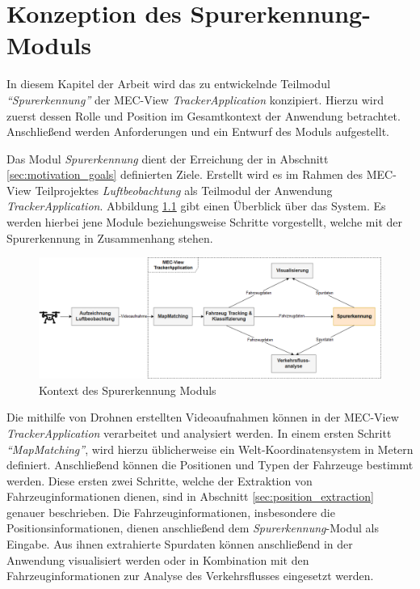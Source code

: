 
\chapter{Konzeption des Spurerkennung-Moduls}
\label{cha:konzeption}

In diesem Kapitel der Arbeit wird das zu entwickelnde Teilmodul \textit{``Spurerkennung''}
der MEC-View \textit{TrackerApplication} konzipiert. Hierzu wird zuerst dessen Rolle und Position im Gesamtkontext
der Anwendung betrachtet. Anschließend werden Anforderungen und ein Entwurf des Moduls aufgestellt.

Das Modul \textit{Spurerkennung} dient der Erreichung der in Abschnitt
\ref{sec:motivation_goals} definierten Ziele. Erstellt wird es im Rahmen des MEC-View Teilprojektes
\textit{Luftbeobachtung} als Teilmodul der Anwendung \textit{TrackerApplication}.
Abbildung \ref{fig:concept_laneDetection_context} gibt einen Überblick über das System.
Es werden hierbei jene Module beziehungsweise Schritte vorgestellt, welche mit der Spurerkennung in
Zusammenhang stehen.

\begin{figure}[H]
    \centering
    \includegraphics[width=\linewidth]{../resources/img/konzeption/Context_LaneDetection}
    \caption{Kontext des Spurerkennung Moduls}
    \label{fig:concept_laneDetection_context}
\end{figure}

Die mithilfe von Drohnen erstellten Videoaufnahmen können in der MEC-View \textit{TrackerApplication}
verarbeitet und analysiert werden. In einem ersten Schritt \textit{``MapMatching''}, wird hierzu üblicherweise
ein Welt-Koordinatensystem in Metern definiert. Anschließend können die Positionen und Typen
der Fahrzeuge bestimmt werden. Diese ersten zwei Schritte, welche der Extraktion von Fahrzeuginformationen
dienen, sind in Abschnitt \ref{sec:position_extraction} genauer beschrieben.
Die Fahrzeuginformationen, insbesondere die Positionsinformationen, dienen anschließend dem \textit{Spurerkennung}-Modul
als Eingabe. Aus ihnen extrahierte Spurdaten können anschließend in der Anwendung visualisiert werden oder in Kombination
mit den Fahrzeuginformationen zur Analyse des Verkehrsflusses eingesetzt werden.


